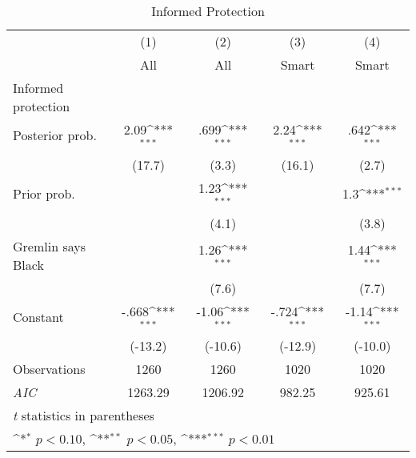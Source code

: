 \begin{table}[htbp]\centering
\def\sym#1{\ifmmode^{#1}\else\(^{#1}\)\fi}
\caption{Informed Protection}
\begin{tabular}{l*{4}{c}}
\hline\hline
                &\multicolumn{1}{c}{(1)}&\multicolumn{1}{c}{(2)}&\multicolumn{1}{c}{(3)}&\multicolumn{1}{c}{(4)}\\
                &\multicolumn{1}{c}{All}&\multicolumn{1}{c}{All}&\multicolumn{1}{c}{Smart}&\multicolumn{1}{c}{Smart}\\
\hline
Informed protection&                  &                  &                  &                  \\
Posterior prob. &     2.09\sym{***}&     .699\sym{***}&     2.24\sym{***}&     .642\sym{***}\\
                &   (17.7)         &    (3.3)         &   (16.1)         &    (2.7)         \\
Prior prob.     &                  &     1.23\sym{***}&                  &      1.3\sym{***}\\
                &                  &    (4.1)         &                  &    (3.8)         \\
Gremlin says Black&                  &     1.26\sym{***}&                  &     1.44\sym{***}\\
                &                  &    (7.6)         &                  &    (7.7)         \\
Constant        &    -.668\sym{***}&    -1.06\sym{***}&    -.724\sym{***}&    -1.14\sym{***}\\
                &  (-13.2)         &  (-10.6)         &  (-12.9)         &  (-10.0)         \\
\hline
Observations    &     1260         &     1260         &     1020         &     1020         \\
\textit{AIC}    &  1263.29         &  1206.92         &   982.25         &   925.61         \\
\hline\hline
\multicolumn{5}{l}{\footnotesize \textit{t} statistics in parentheses}\\
\multicolumn{5}{l}{\footnotesize \sym{*} \(p<0.10\), \sym{**} \(p<0.05\), \sym{***} \(p<0.01\)}\\
\end{tabular}
\end{table}

